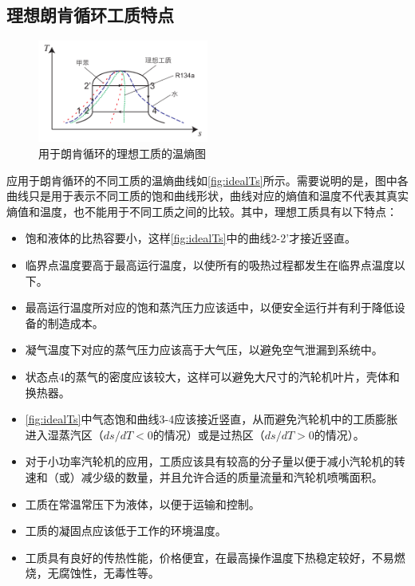 \subsection{理想朗肯循环工质特点}
\label{sec:IdealRankineCycleFluid}

\begin{figure}[!ht]
\centering 
\includegraphics[width=0.5\textwidth]{fig/idealTs}
\caption{用于朗肯循环的理想工质的温熵图}
\label{fig:idealTs}
\end{figure}

应用于朗肯循环的不同工质的温熵曲线如\autoref{fig:idealTs}所示。需要说明的是，图中各曲线只是用于表示不同工质的饱和曲线形状，曲线对应的熵值和温度不代表其真实熵值和温度，也不能用于不同工质之间的比较。其中，理想工质具有以下特点\cite{Abbin1977}：
\begin{itemize}

	\item 饱和液体的比热容要小，这样\autoref{fig:idealTs}中的曲线2-2'才接近竖直。
	\item 临界点温度要高于最高运行温度，以使所有的吸热过程都发生在临界点温度以下。
	\item 最高运行温度所对应的饱和蒸汽压力应该适中，以便安全运行并有利于降低设备的制造成本。
	\item 凝气温度下对应的蒸气压力应该高于大气压，以避免空气泄漏到系统中。
	\item 状态点4的蒸气的密度应该较大，这样可以避免大尺寸的汽轮机叶片，壳体和换热器。
	\item \autoref{fig:idealTs}中气态饱和曲线3-4应该接近竖直，从而避免汽轮机中的工质膨胀进入湿蒸汽区（$ds/dT < 0$的情况）或是过热区（$ds/dT > 0$的情况）。
	\item 对于小功率汽轮机的应用，工质应该具有较高的分子量以便于减小汽轮机的转速和（或）减少级的数量，并且允许合适的质量流量和汽轮机喷嘴面积。
	\item 工质在常温常压下为液体，以便于运输和控制。
	\item 工质的凝固点应该低于工作的环境温度。
	\item 工质具有良好的传热性能，价格便宜，在最高操作温度下热稳定较好，不易燃烧，无腐蚀性，无毒性等。
\end{itemize}

